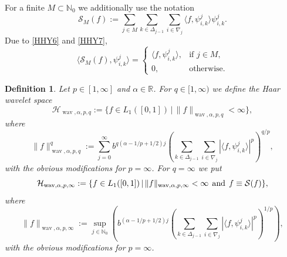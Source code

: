 \documentclass[12pt]{article}
\DeclareMathOperator{\wav}{wav}
\newtheorem{definition}{Definition}
\newcommand{\NN}{\mathbb{N}}
\newcommand{\RR}{\mathbb{R}}
\newcommand{\N}{\mathbb{N}}
\newcommand{\mig}[1]{\textcolor{blue}{#1}}
\begin{document}
For a finite $M\subset \NN_0$ we additionally use the notation
\begin{equation}\label{partial_sum_S}
\mathcal{S}_M(f) := \sum_{j\in M} \sum_{k\in \Delta_{j-1}}
\sum_{i\in \nabla_{j}} \langle f, \psi^{j}_{i,k} \rangle
\psi^{j}_{i,k}.
\end{equation}
Due to \eqref{HHY6} and \eqref{HHY7},
\begin{equation}\label{eq:coefficients_finite_sum}
\langle \mathcal{S}_M(f), \psi^j_{i,k} \rangle =
\begin{cases}
\langle f, \psi^j_{i,k} \rangle, & \text{if $j\in M$,}\\
0, & \text{otherwise.}
\end{cases}
\end{equation}

\begin{definition}\label{Def:Wavelet_Space_Uni}
Let $p \in [1,\infty]$ and
$\alpha\in\RR$. For $q\in [1,\infty)$ we define the \emph{Haar wavelet space}
\begin{equation}\label{def:wavelet_spaces_1}
 \mathcal{H}_{\wav,\alpha,p,q} :=
\{ f\in L_1([0,1]) \,|\,  \|f\|_{\wav,\alpha,p,q} <\infty\},
\end{equation}
where 
\begin{equation*}
\|f\|^q_{\wav,\alpha,p,q} :=
\sum_{j=0}^\infty b^{q (\alpha-1/p + 1/2) j} \left(
\sum_{k\in\Delta_{j-1}} \sum_{i\in\nabla_j}
|\langle f, \psi^j_{i,k} \rangle|^p \right)^{q/p},
\end{equation*}
with the obvious modifications for $p =\infty$.
For $q= \infty$ we put 
\begin{equation}\label{def:wavelet_spaces_2}
 \mathcal{H}_{\wav,\alpha,p,\infty} :=
\{ f\in L_1([0,1]) \,|\,   \|f\|_{\wav,\alpha,p,\infty} <\infty \hspace{1ex}\text{and}\hspace{1ex} f \equiv \mathcal{S}(f) \},
\end{equation}
where 
\begin{equation*}
\|f\|_{\wav,\alpha,p,\infty} :=
\sup_{j\in \N_0} \left( b^{(\alpha-1/p + 1/2) j} \left(
\sum_{k\in\Delta_{j-1}} \sum_{i\in\nabla_j}
|\langle f, \psi^j_{i,k} \rangle|^p \right)^{1/p} \right) ,
\end{equation*}
with the obvious modifications for $p =\infty$.
\end{definition}
\end{document}
